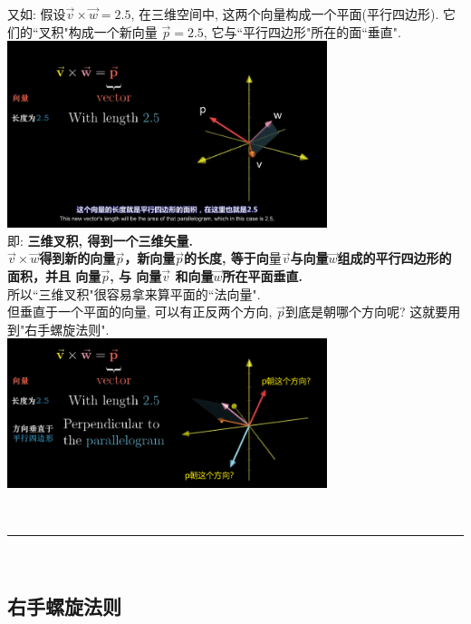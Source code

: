 \documentclass[UTF8]{ctexart}
\begin{document}
\begin{myEnvSample}
	又如: 假设$\vec{v} \times \vec{w} = 2.5$, 在三维空间中, 这两个向量构成一个平面(平行四边形). 它们的``叉积"构成一个新向量 $\vec{p}=2.5$, 它与``平行四边形"所在的面``垂直".\\

	\includegraphics[width=0.7\textwidth]{img/0080.png}\\

	即: \textbf{三维叉积, 得到一个三维矢量.}   \\
	\textbf{$\vec{v} \times \vec{w}$得到新的向量$\vec{p}$，新向量$\vec{p}$的长度, 等于向$量\vec{v}$与向量$\vec{w}$组成的平行四边形的面积，并且 向量$\vec{p}$,  与 向量$\vec{v}$ 和向量$\vec{w}$所在平面垂直.}\\
	所以``三维叉积"很容易拿来算平面的``法向量". \\

	但垂直于一个平面的向量, 可以有正反两个方向, $\vec{p} $到底是朝哪个方向呢? 这就要用到"右手螺旋法则".\\

	\includegraphics[width=0.7\textwidth]{img/0081.png}
\end{myEnvSample}


~\\
\hrule
~\\

\subsection{右手螺旋法则}
\end{document}
